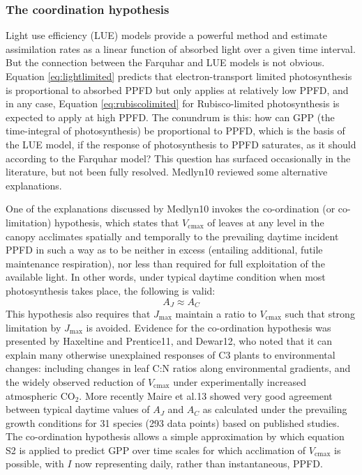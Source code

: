 \documentclass{myreport}
\begin{document}
\subsubsection{The coordination hypothesis}
\label{sec:coordination}
Light use efficiency (LUE) models provide a powerful method and estimate assimilation rates as a linear function of absorbed light over a given time interval. 
But the connection between the Farquhar and LUE models is not obvious. 
Equation \ref{eq:lightlimited} predicts that electron-transport limited photosynthesis is proportional to absorbed PPFD but only applies at relatively low PPFD, and in any case, Equation \ref{eq:rubiscolimited} for Rubisco-limited photosynthesis is expected to apply at high PPFD. 
The conundrum is this: how can GPP (the time-integral of photosynthesis) be proportional to PPFD, which is the basis of the LUE model, if the response of photosynthesis to PPFD saturates, as it should according to the Farquhar model? This question has surfaced occasionally in the literature, but not been fully resolved. 
Medlyn10 reviewed some alternative explanations.
 
One of the explanations discussed by Medlyn10 invokes the co-ordination (or co-limitation) hypothesis, which states that $V_{\mathrm{cmax}}$ of leaves at any level in the canopy acclimates spatially and temporally to the prevailing daytime incident PPFD in such a way as to be neither in excess (entailing additional, futile maintenance respiration), nor less than required for full exploitation of the available light. 
In other words, under typical daytime condition when most photosynthesis takes place, the following is valid:
\begin{equation}
\label{eq:coordination}
    A_J \approx A_C
\end{equation}
This hypothesis also requires that $J_{\mathrm{max}}$ maintain a ratio to $V_{\mathrm{cmax}}$ such that strong limitation by $J_{\mathrm{max}}$ is avoided. 
Evidence for the co-ordination hypothesis was presented by Haxeltine and Prentice11, and Dewar12, who noted that it can explain many otherwise unexplained responses of C3 plants to environmental changes: including changes in leaf C:N ratios along environmental gradients, and the widely observed reduction of $V_{\mathrm{cmax}}$ under experimentally increased atmospheric CO$_2$. More recently Maire et al.13 showed very good agreement between typical daytime values of $A_J$ and $A_C$ as calculated under the prevailing growth conditions for 31 species (293 data points) based on published studies. 
The co-ordination hypothesis allows a simple approximation by which equation S2 is applied to predict GPP over time scales for which acclimation of $V_{\mathrm{cmax}}$ is possible, with $I$ now representing daily, rather than instantaneous, PPFD.
\end{document}
